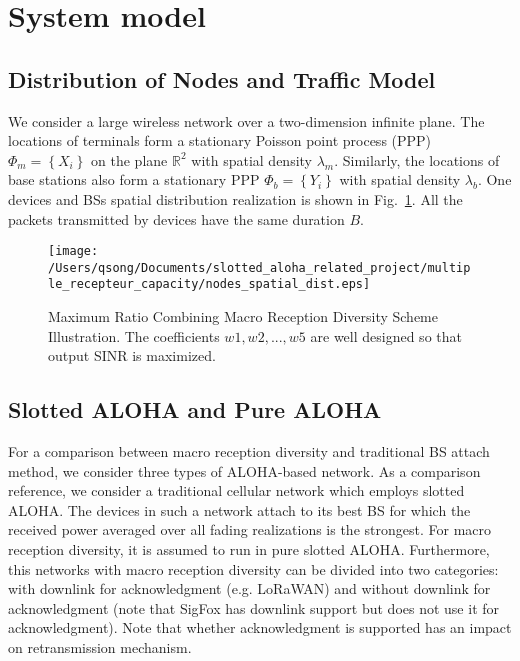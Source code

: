\section{System model}
\label{sec:system_model}
\subsection{Distribution of Nodes and Traffic Model}
We consider a large wireless network over a two-dimension infinite plane. The locations of terminals form a stationary Poisson point process (PPP) $\Phi_m = \left\lbrace X_i\right\rbrace$ on the plane $\mathbb{R}^2$ with spatial density $\lambda_m$.  Similarly, the locations of base stations also form a stationary PPP $\Phi_b = \left\lbrace Y_i\right\rbrace$ with spatial density $\lambda_b$. One devices and BSs spatial distribution realization is shown in Fig.~\ref{fig:device_BS_spatial_distribution}. All the packets transmitted by devices have the same duration $B$.
\begin{figure}[!ht]
	\centering
	\texttt{[image: /Users/qsong/Documents/slotted\_aloha\_related\_project/multiple\_recepteur\_capacity/nodes\_spatial\_dist.eps]}
	\caption{Maximum Ratio Combining Macro Reception Diversity Scheme Illustration. The coefficients $w1, w2, ..., w5$ are well designed so that output SINR is maximized.}
	\label{fig:device_BS_spatial_distribution}
\end{figure} 

\subsection{Slotted ALOHA and Pure ALOHA}
For a comparison between macro reception diversity and traditional BS attach method, we consider three types of ALOHA-based network. As a comparison reference, we consider a traditional cellular network which employs slotted ALOHA. The devices in such a network attach to its best BS for which the received power averaged over all fading realizations is the strongest. For macro reception diversity, it is assumed to run in pure slotted ALOHA. Furthermore, this networks with macro reception diversity can be divided into two categories: with downlink for acknowledgment (e.g. LoRaWAN) and without downlink for acknowledgment (note that SigFox has downlink support but does not use it for acknowledgment). Note that whether acknowledgment is supported has an impact on retransmission mechanism. 

